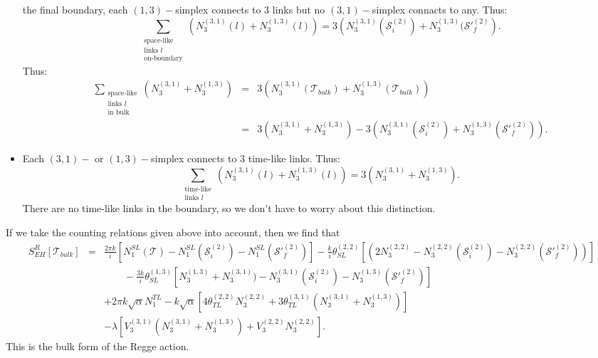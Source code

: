 \documentclass{article}
\begin{document}
\begin{itemize}
  the final boundary, each $(1,3)-$simplex connects to 3 links but no
  $(3,1)-$simplex connacts to any. Thus:
  $$\sum_{\substack{\text{space-like}\\\text{links }l\\\text{on-boundary}}} (N_3^{(3,1)}(l) + N_3^{(1,3)}(l)) = 3\left(N_3^{(3,1)}(\mathcal{S}^{(2)}_i) + N_3^{(1,3)}(\mathcal{S}'^{(2)}_f\right).$$
  Thus:
  \begin{eqnarray}
    \label{eq:31:sl}
    \sum_{\substack{\text{space-like}\\\text{links }l\\\text{in bulk}}}\left(N_3^{(3,1)}+N_3^{(1,3)}\right) &=& 3\left(N_3^{(3,1)}(\mathcal{T}_{bulk})+N_3^{(1,3)}(\mathcal{T}_{bulk})\right) \nonumber\\
    &=& 3\left(N_3^{(3,1)}+N_3^{(1,3)}\right) - 3\left(N_3^{(3,1)}(\mathcal{S}^{(2)}_i) + N_3^{(1,3)}(\mathcal{S}'^{(2)}_f)\right).
  \end{eqnarray}
\item Each $(3,1)-$ or $(1,3)-$simplex connects to 3 time-like
  links. Thus:
  \begin{equation}
    \label{eq:31:tl}
    \sum_{\substack{\text{time-like}\\\text{links }l}}\left(N_3^{(3,1)}(l)+N_3^{(1,3)}(l)\right) = 3 \left(N_3^{(3,1)}+N_3^{(1,3)}\right).
  \end{equation}
  There are no time-like links in the boundary, so we don't have to
  worry about this distinction.
\end{itemize}

If we take the counting relations given above into account, then we
find that
\begin{eqnarray}
  \label{eq:regge:4}
  S^{R}_{EH}[\mathcal{T}_{bulk}] &=& \frac{2\pi k}{i}\left[N_1^{SL}(\mathcal{T}) - N_1^{SL}(\mathcal{S}^{(2)}_i) - N_1^{SL}(\mathcal{S}'^{(2)}_f)\right] 
   - \frac{k}{i} \theta_{SL}^{(2,2)}\left[ \left(2 N_3^{(2,2)} - N_3^{(2,2)}(\mathcal{S}^{(2)}_i) - N_3^{(2,2)}(\mathcal{S}'^{(2)}_f)\right)\right] \nonumber\\
  &&\qquad - \frac{3k}{i} \theta_{SL}^{(1,3)}\left[ N_3^{(1,3)} + N_3^{(3,1)}) - N_3^{(3,1)}(\mathcal{S}^{(2)}_i) - N_3^{(1,3)}(\mathcal{S}'^{(2)}_f)\right]\\
  && + 2 \pi k\sqrt{\alpha} N_1^{TL} - k \sqrt{\alpha} \left[4 \theta_{TL}^{(2,2)} N_3^{(2,2)} + 3 \theta_{TL}^{(3,1)}\left(N_3^{(3,1)}+N_3^{(1,3)}\right)\right]\nonumber\\
  &&-\lambda \left[V_3^{(3,1)}(N_3^{(3,1)}+N_3^{(1,3)}) + V_3^{(2,2)} N_3^{(2,2)}\right].\nonumber
\end{eqnarray}
This is the bulk form of the Regge action.
\end{document}
